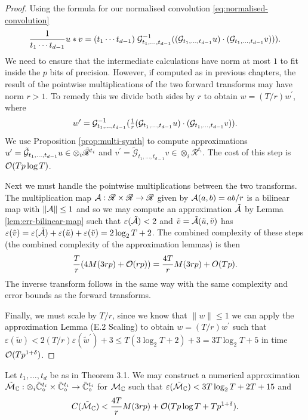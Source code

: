 \begin{proof}
    Using the formula for our normalised convolution \eqref{eq:normalised-convolution}
    \[
        \frac{1}{t_1 \cdots t_{d-1}}u \ast v = (t_1 \cdots t_{d-1})\; \mathcal G^{-1}_{t_1, \ldots, t_{d-1}}((\mathcal G_{t_1, \ldots, t_{d-1}}u)\cdot (\mathcal G_{t_1, \ldots, t_{d-1}} v))).
    \]
    We need to ensure that the intermediate calculations have norm at most $1$ to fit inside the $p$ bits of precision. However, if computed as in previous chapters, the result of the pointwise multiplications of the two forward transforms may have norm $r > 1$. To remedy this we divide both sides by $r$ to obtain $w = (T/r)w^\prime$, where
    \begin{equation}\label{eq:idk}
        w^\prime = \mathcal G^{-1}_{t_1, \ldots, t_{d-1}}(\tfrac{1}{r}(\mathcal G_{t_1, \ldots, t_{d-1}}u) \cdot (\mathcal G_{t_1, \ldots, t_{d-1}}v)).
    \end{equation}
    We use Proposition \ref{prop:multi-synth} to compute approximations $u^\prime = \tilde{\mathcal G}_{t_1, \ldots, t_{d-1}} u \in \otimes_i \tilde{\mathscr{R}}^{t_i}$ and $v^\prime = \tilde{\mathscr{G}}_{t_1, \ldots, t_{d-1}} v \in \otimes_i \mathscr{R}^{t_i}$. The cost of this step is $\mathcal O(Tp \log T)$.

    Next we must handle the pointwise multiplications between the two transforms. The multiplication map $\mathcal A: \mathscr{R} \times \mathscr{R} \to \mathscr{R}$ given by $\mathcal A(a, b) = ab/r$ is a bilinear map with $\|\mathcal A\| \le 1$ and so we may compute an approximation $\tilde{\mathcal A}$ by Lemma \ref{lem:err-bilinear-map} such that $\varepsilon(\tilde{\mathcal A}) < 2$ and $\tilde{v} = \tilde{\mathcal A}(\tilde{u}, \tilde{v})$ has $\varepsilon(\tilde{v}) = \varepsilon(\tilde{\mathcal A}) + \varepsilon(\tilde{u}) + \varepsilon(\tilde{v}) = 2\log_2 T + 2$. The combined complexity of these steps (the combined complexity of the approximation lemmas) is then
    \[
        \frac{T}{r}(4M(3rp) + \mathcal O(rp)) = \frac{4T}{r} M(3rp) + O(Tp).
    \]
    The inverse transform follows in the same way with the same complexity and error bounds as the forward transforms.

    Finally, we must scale by $T/r$, since we know that $\|w\| \le 1$ we can apply the approximation Lemma (E.2 Scaling) to obtain $w = (T/r)w^\prime$ such that $\varepsilon(\tilde{w}) < 2(T/r)\varepsilon(\tilde{w}^\prime) + 3 \le T(3 \log_2 T + 2) + 3 = 3T\log_2 T + 5$ in time $\mathcal O(Tp^{1 + \delta})$.
\end{proof}

\begin{proposition}\label{prop:final}
    Let $t_1, \ldots, t_d$ be as in Theorem 3.1. We may construct a numerical approximation $\tilde{\mathcal M}_{\mathbb C}: \otimes_i \tilde{{\mathbb C}}^{t_i}_\circ \times \tilde{{\mathbb C}}^{t_i}_\circ \to \tilde{{\mathbb C}}^{t_i}_\circ$ for $\mathcal M_{\mathbb C}$ such that $\varepsilon(\tilde{\mathcal M}_{\mathbb C}) < 3 T \log_2 T + 2 T + 15$ and
    \[
        C(\tilde{\mathcal M}_{\mathbb C}) < \frac{4T}{r} M(3rp) + \mathcal O(Tp \log T + Tp^{1 + \delta}).
    \]
\end{proposition}

